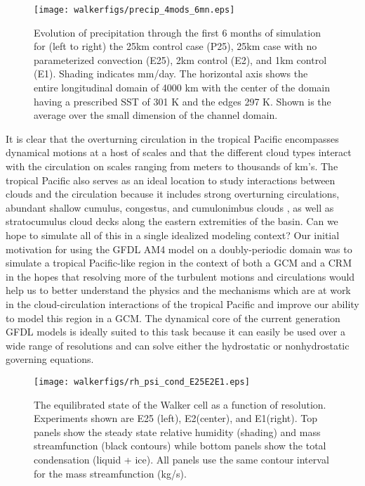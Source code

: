 \documentclass[draft]{agujournal2019}
\begin{document}
\begin{figure}
  \texttt{[image: walkerfigs/precip\_4mods\_6mn.eps]}
  \caption{Evolution of precipitation through the first 6 months of simulation for (left to right) the 25km control case (P25), 
  25km case with no parameterized convection (E25), 2km control (E2), and 1km control (E1).  
  Shading indicates mm/day.  The horizontal axis shows the entire 
  longitudinal domain of 4000 km with the center of the domain having a prescribed SST of 301 K and the edges 297 K.  
  Shown is the average over the small dimension of the channel domain. } 
  \label{fig:hov_4mods_6mn}
\end{figure}

It is clear that the overturning circulation in the tropical Pacific encompasses dynamical motions at a host of scales and that the 
different cloud types interact with the circulation on scales ranging from meters to thousands of km's.  
The tropical Pacific also serves as an ideal location to study interactions between clouds and the 
circulation because it includes strong overturning circulations, abundant shallow cumulus, congestus, and cumulonimbus 
clouds \cite{Johnson1999}, as well as stratocumulus cloud decks along the eastern extremities of the basin.
Can we hope to simulate all of this in a single idealized modeling context?    
Our initial motivation for using the GFDL AM4 model on a doubly-periodic domain was to simulate 
a tropical Pacific-like region 
in the context of both a GCM and a CRM in the hopes that resolving more of the turbulent motions and circulations
would help us to better understand the physics and the mechanisms which are at work in the cloud-circulation
interactions of the tropical Pacific and improve our ability to model this region in a GCM.    
The dynamical core of the current generation GFDL models is ideally suited to this task because it can easily 
be used over a wide range of resolutions and can solve either the hydrostatic or nonhydrostatic 
governing equations.  

\begin{figure}
  \centering
      \texttt{[image: walkerfigs/rh\_psi\_cond\_E25E2E1.eps]}
      \caption{The equilibrated state of the Walker cell as a function of resolution.  
      Experiments shown are E25 (left), E2(center), and E1(right). Top panels show the 
      steady state relative humidity (shading) and mass streamfunction (black contours)
      while bottom panels show the total condensation (liquid + ice).  
      All panels use the same contour interval for the 
      mass streamfunction (kg/s).}
  \label{fig:rh_psi_P25E2E1}
\end{figure}
\end{document}
